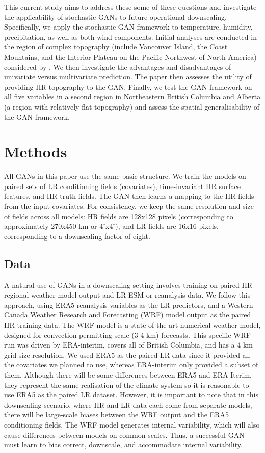 \documentclass{ametsocV6.1}
\begin{document}
This current study aims to address these some of these questions and investigate the applicability of stochastic GANs to future operational downscaling. Specifically, we apply the stochastic GAN framework to temperature, humidity, precipitation, as well as both wind components. Initial analyses are conducted in the region of complex topography (include Vancouver Island, the Coast Mountains, and the Interior Plateau on the Pacific Northwest of North America) considered by \citet{daust2024capturing}. We then investigate the advantages and disadvantages of univariate versus multivariate prediction. The paper then assesses the utility of providing HR topography to the GAN. Finally, we test the GAN framework on all five variables in a second region in Northeastern British Columbia and Alberta (a region with relatively flat topography) and assess the spatial generalisability of the GAN framework.

\section{Methods}
All GANs in this paper use the same basic structure. We train the models on paired sets of LR conditioning fields (covariates), time-invariant HR surface features, and HR truth fields. The GAN then learns a mapping to the HR fields from the input covariates. For consistency, we keep the same resolution and size of fields across all models: HR fields are 128x128 pixels (corresponding to approximately 270x450 km or $4^\circ$x$4^\circ$), and LR fields are 16x16 pixels, corresponding to a downscaling factor of eight. 

\subsection{Data}
A natural use of GANs in a downscaling setting involves training on paired HR regional weather model output and LR ESM or reanalysis data. We follow this approach, using ERA5 reanalysis variables as the LR predictors, and a Western Canada Weather Research and Forecasting (WRF) model output \citep{li2019high} as the paired HR training data. The WRF model is a state-of-the-art numerical weather model, designed for convection-permitting scale (3-4 km) forecasts. This specific WRF run was driven by ERA-interim, covers all of British Columbia, and has a 4 km grid-size resolution. We used ERA5 as the paired LR data since it provided all the covariates we planned to use, whereas ERA-interim only provided a subset of them. Although there will be some differences between ERA5 and ERA-Iterim, they represent the same realisation of the climate system so it is reasonable to use ERA5 as the paired LR dataset. However, it is important to note that in this  downscaling scenario, where HR and LR data each come from separate models, there will be large-scale biases between the WRF output and the ERA5 conditioning fields. The WRF model generates internal variability, which will also cause differences between models on common scales. Thus, a successful GAN must learn to bias correct, downscale, and accommodate internal variability.
\end{document}

